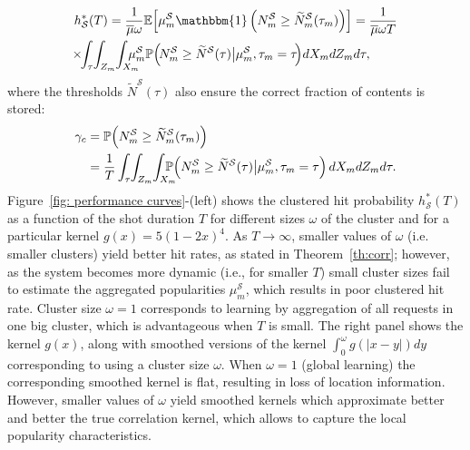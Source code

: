 \documentclass[10pt, conference, letterpaper]{IEEEtran}
\newcommand{\mean}[1]{\mathbb{E}\!\left[#1\right]}
\newcommand{\prob}[1]{\mathbb{P}\!\left(#1\right)}
\def\ind{\mathbbm{1}}
\begin{document}
\begin{align*}
&h^*_\mathcal S(T)=\frac1{\overline\mu\omega}\mean{\mu_m^\mathcal S\ind\left(N_m^\mathcal S\geq\widetilde N_m^\mathcal S(\tau_m)\right)}=\frac{1}{\overline\mu\omega T}\\
&\hspace{-0.05in}\times\hspace{-0.05in}\int_\tau\hspace{-0.03in}\int_{Z_m}\hspace{-0.03in}\int_{X_m}\hspace{-0.15in}\mu_m^\mathcal S\prob{\hspace{-0.02in}N_m^\mathcal S\geq\widetilde N^\mathcal S(\tau)\big|\mu_m^\mathcal S,\tau_m=\tau\hspace{-0.03in}}\hspace{-0.02in}dX_mdZ_md\tau,
\end{align*}
where the thresholds $\widetilde N^\mathcal S(\tau)$ also ensure the correct fraction of contents is stored:
\begin{align*}
\gamma_c&=\prob{N_m^\mathcal S\geq\widetilde N_m^\mathcal S(\tau_m)}\\
&=\frac{1}{T}\int_\tau\hspace{-0.03in}\int_{Z_m}\hspace{-0.03in}\int_{X_m}\hspace{-0.15in}\prob{N_m^\mathcal S\geq\widetilde N^\mathcal S(\tau)\big|\mu_m^\mathcal S,\tau_m=\tau}dX_mdZ_md\tau.
\end{align*}
Figure~\ref{fig: performance curves}-(left) shows the clustered hit probability $h_\mathcal S^*(T)$ as a function of the shot duration $T$ for different sizes $\omega$ of the cluster and for a particular kernel $g(x)=5\left(1-2x\right)^4$.
As $T\to\infty$, smaller values of $\omega$ (i.e. smaller clusters) yield better hit rates, as stated in Theorem~\ref{th:corr}; however, as the system becomes more dynamic (i.e., for smaller $T$) small cluster sizes fail to estimate the aggregated popularities $\mu_m^\mathcal S$, which results in poor clustered hit rate.
Cluster size $\omega=1$ corresponds to learning by aggregation of all requests in one big cluster, which is advantageous when $T$ is small. 
 The right panel shows the kernel $g(x)$, along with smoothed versions of the kernel $\int_0^\omega g(|x-y|)dy$ corresponding to using a cluster size $\omega$. 
When $\omega=1$ (global learning) the corresponding smoothed kernel is flat, resulting in loss of location information. 
However, smaller values of $\omega$ yield smoothed kernels which approximate better and better the true correlation kernel, which allows to capture the local popularity characteristics. 
\end{document}

